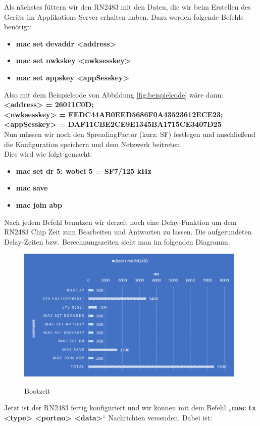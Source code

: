 Als nächstes füttern wir den RN2483 mit den Daten, die wir beim Erstellen des Geräts im Applikations-Server erhalten haben. Dazu werden folgende Befehle benötigt:
\begin{itemize}
    \item \textbf{mac set devaddr <address>}
    \item \textbf{mac set nwkskey <nwksesskey>}
    \item \textbf{mac set appskey <appSesskey>}
\end{itemize}
Also mit dem Beispielcode von Abbildung \ref{fig:beispielcode} wäre dann:\\
\textbf{<address> = 26011C0D;}\\
\textbf{<nwksesskey> = FEDC44AB0EED5686F0A43523612ECE23;}\\
\textbf{<appSesskey> = DAF11CBE2CE9E1345BA1715CE3407D25}\\

Nun müssen wir noch den SpreadingFactor (kurz: SF) festlegen und anschließend die Konfiguration speichern und dem Netzwerk beitreten.\\
Dies wird wie folgt gemacht: 

\begin{itemize}
    \item \textbf{mac set dr 5: wobei 5 = SF7/125 kHz}
    \item \textbf{mac save}
    \item \textbf{mac join abp}
\end{itemize}

Nach jedem Befehl benutzen wir derzeit noch eine Delay-Funktion um dem RN2483 Chip Zeit zum Bearbeiten und Antworten zu lassen. Die aufgerundeten Delay-Zeiten bzw. Berechnungszeiten sieht man im folgenden Diagramm.

\begin{figure}[ht]
    \center
    \includegraphics[width=11cm]{Bilder/lora-9.png}\\
    \caption{Bootzeit}
    \label{fig:boot-time}
\end{figure}
Jetzt ist der RN2483 fertig konfiguriert und wir können mit dem Befehl „\textbf{mac tx <type> <portno> <data>}“ Nachrichten versenden. Dabei ist:\\

